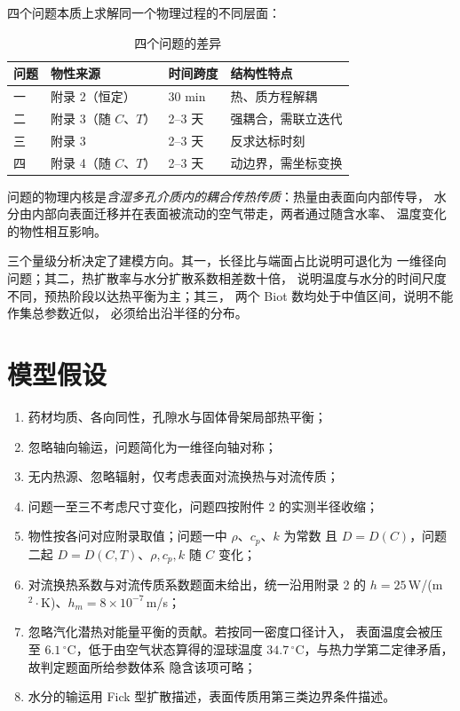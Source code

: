 \documentclass[12pt,a4paper]{ctexart}
\begin{document}
四个问题本质上求解同一个物理过程的不同层面：

\begin{table}[htbp]
  \centering
  \caption{四个问题的差异}
  \label{tab:overview}
  \small
  \begin{tabular}{llll}
    \toprule
    问题 & 物性来源 & 时间跨度 & 结构性特点 \\
    \midrule
    一 & 附录 2（恒定）        & 30 min  & 热、质方程解耦 \\
    二 & 附录 3（随 $C$、$T$） & 2--3 天 & 强耦合，需联立迭代 \\
    三 & 附录 3                & 2--3 天 & 反求达标时刻 \\
    四 & 附录 4（随 $C$、$T$） & 2--3 天 & 动边界，需坐标变换 \\
    \bottomrule
  \end{tabular}
\end{table}

问题的物理内核是\emph{含湿多孔介质内的耦合传热传质}：热量由表面向内部传导，
水分由内部向表面迁移并在表面被流动的空气带走，两者通过随含水率、
温度变化的物性相互影响。

三个量级分析决定了建模方向。其一，长径比与端面占比说明可退化为
一维径向问题；其二，热扩散率与水分扩散系数相差数十倍，
说明温度与水分的时间尺度不同，预热阶段以达热平衡为主；其三，
两个 Biot 数均处于中值区间，说明不能作集总参数近似，
必须给出沿半径的分布。

\section{模型假设}

\begin{enumerate}
  \item[(A1)] 药材均质、各向同性，孔隙水与固体骨架局部热平衡；
  \item[(A2)] 忽略轴向输运，问题简化为一维径向轴对称；
  \item[(A3)] 无内热源、忽略辐射，仅考虑表面对流换热与对流传质；
  \item[(A4)] 问题一至三不考虑尺寸变化，问题四按附件 2 的实测半径收缩；
  \item[(A5)] 物性按各问对应附录取值；问题一中 $\rho$、$c_p$、$k$ 为常数
        且 $D=D(C)$，问题二起 $D=D(C,T)$、$\rho,c_p,k$ 随 $C$ 变化；
  \item[(A6)] 对流换热系数与对流传质系数题面未给出，统一沿用附录 2 的
        $h=25$\,W/(m$^2\cdot$K)、$h_m=8\times10^{-7}$\,m/s；
  \item[(A7)] 忽略汽化潜热对能量平衡的贡献。若按同一密度口径计入，
        表面温度会被压至 $6.1\,^\circ$C，低于由空气状态算得的湿球温度
        $34.7\,^\circ$C，与热力学第二定律矛盾，故判定题面所给参数体系
        隐含该项可略；
  \item[(A8)] 水分的输运用 Fick 型扩散描述，表面传质用第三类边界条件描述。
\end{enumerate}
\end{document}
